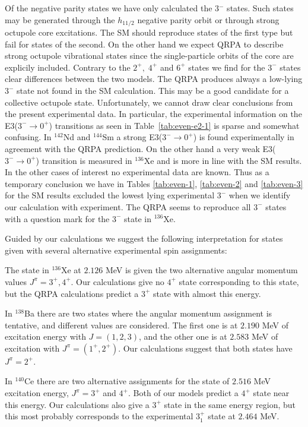 Of the negative parity states we have only calculated the 3$^{-}$ states. 
Such states may be generated through the $h_{11/2}$ negative parity orbit or 
through strong octupole core excitations.
The SM should reproduce states of the first type but fail for states of the second.
On the other hand we expect QRPA to describe strong octupole vibrational states since  
the single-particle orbits of the core are explicily included.  
Contrary to the $2^{+},\;4^{+}$ and $6^{+}$ states we find for the $3^{-}$ states clear 
differences between the two models. The QRPA produces always
a low-lying $3^{-}$ state not found in the SM
calculation. This may be a good candidate for 
a collective octupole state.
Unfortunately, we cannot draw clear conclusions from the present
experimental data. In particular, the experimental information
on the E3($3^{-} \rightarrow 0^{+}$) transitions
as seen in Table~\ref{tab:even-e2-1}
is sparse and somewhat confusing.
In $^{142}$Nd and $^{144}$Sm a strong   E3($3^{-} \rightarrow 0^{+}$) is found 
experimentally in agreement with the QRPA prediction. On the other hand a 
very weak  E3($3^{-} \rightarrow 0^{+}$) transition  is measured in $^{136}$Xe and  
is more in line with the SM results. 
In the other cases of interest no experimental data are 
known. Thus as a temporary conclusion we have in  
Tables \ref{tab:even-1}, \ref{tab:even-2} and \ref{tab:even-3} for the SM 
results excluded
the lowest lying experimental $3^{-}$ 
when we identify our calculation with experiment.
The QRPA seems to reproduce all $3^{-}$ states with a question mark for the 
$3^{-}$ state in $^{136}$Xe.

Guided by our calculations we suggest the following interpretation for 
states given with several alternative experimental spin assignments:

The state in $^{136}$Xe at $2.126$ MeV is given the two alternative angular 
momentum values $J^{\pi} = 3^{+},4^{+}$. Our calculations 
give no $4^{+}$ state corresponding to this state, but the QRPA 
calculations predict a $3^{+}$ state with almost this energy.

In $^{138}$Ba there are two states where the angular momentum assignment is
tentative, and different values are considered. The first one is at $2.190$ 
MeV of excitation energy with $J=(1,2,3)$, and the other one is at $2.583$ MeV 
of excitation with $J^{\pi} = (1^{+},2^{+})$. Our calculations suggest that 
both states have $J^{\pi} = 2^{+}$.

In $^{140}$Ce there are two alternative assignments for the state of $2.516$
MeV excitation energy, $J^{\pi} = 3^{+}$ and $4^{+}$. Both of our models 
predict a $4^{+}$ state near this energy. Our calculations also give a 
$3^{+}$ state in the same energy region, but this most probably corresponds 
to the experimental $3^{+}_{1}$ state at $2.464$ MeV.


